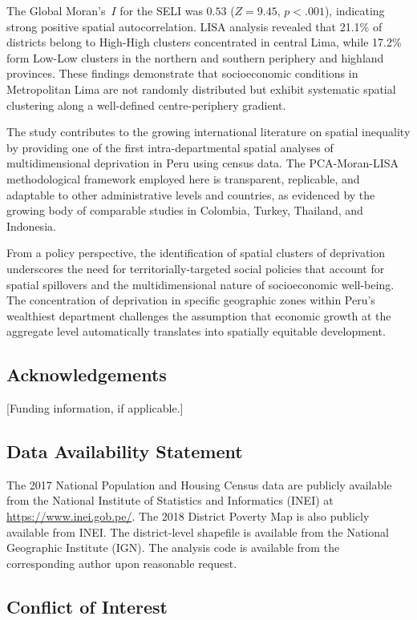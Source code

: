 \documentclass[12pt,a4paper,twoside]{article}
\begin{document}
The Global Moran's~$I$ for the SELI was $0.53$ ($Z = 9.45$, $p < .001$),
indicating strong positive spatial autocorrelation. LISA analysis revealed that
21.1\% of districts belong to High-High clusters concentrated in central Lima,
while 17.2\% form Low-Low clusters in the northern and southern periphery and
highland provinces. These findings demonstrate that socioeconomic conditions
in Metropolitan Lima are not randomly distributed but exhibit systematic spatial
clustering along a well-defined centre-periphery gradient.

The study contributes to the growing international literature on spatial
inequality by providing one of the first intra-departmental spatial analyses
of multidimensional deprivation in Peru using census data. The PCA-Moran-LISA
methodological framework employed here is transparent, replicable, and adaptable
to other administrative levels and countries, as evidenced by the growing body
of comparable studies in Colombia, Turkey, Thailand, and Indonesia.

From a policy perspective, the identification of spatial clusters of deprivation
underscores the need for territorially-targeted social policies that account for
spatial spillovers and the multidimensional nature of socioeconomic well-being.
The concentration of deprivation in specific geographic zones within Peru's
wealthiest department challenges the assumption that economic growth at the
aggregate level automatically translates into spatially equitable development.

\subsection*{Acknowledgements}

[Funding information, if applicable.]

\subsection*{Data Availability Statement}

The 2017 National Population and Housing Census data are publicly available from
the National Institute of Statistics and Informatics (INEI) at
\url{https://www.inei.gob.pe/}. The 2018 District Poverty Map is also publicly
available from INEI. The district-level shapefile is available from the National
Geographic Institute (IGN). The analysis code is available from the corresponding
author upon reasonable request.

\subsection*{Conflict of Interest}
\end{document}
